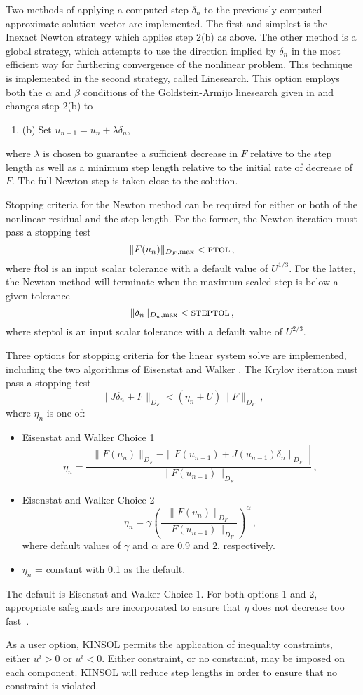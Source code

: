 Two methods of applying a computed step $\delta_n$ to the previously computed
approximate solution vector are implemented.  The 
first and simplest is the Inexact Newton strategy which applies step 2(b) 
as above.  
The other method is a global strategy,
which attempts to use the direction implied by $\delta_n$ 
in the most efficient way for furthering convergence of the nonlinear problem. 
This technique 
is implemented in the second strategy, called Linesearch.  This option
employs both the $\alpha$ and $\beta$ conditions of the Goldstein-Armijo
linesearch given in \cite{DeSc:96} and changes step 2(b) to
\begin{enumerate}
  \addtocounter{enumi}{1}
\item{(b)$\;$Set $u_{n+1} = u_n + \lambda \delta_n$},
\end{enumerate}
where $\lambda$ is chosen to guarantee a sufficient decrease in $F$ 
relative to the step length as well as a minimum step length relative 
to the initial rate of decrease of $F$.  The full Newton step is taken
close to the solution.

Stopping criteria for the Newton method can be required for either or 
both of the nonlinear residual and the step length.  For the former, 
the Newton iteration must pass a stopping test
\[ \|F(u_n)\|_{D_F,\mbox{\scriptsize max}} < \mbox{\sc ftol} \, , \]
where {\sc ftol} is an input scalar tolerance with a default value of
$U^{1/3}$. 
For the latter, the Newton method will terminate when the maximum scaled step
is below a given tolerance
\[ \|\delta_n\|_{D_u,\mbox{\scriptsize max}} < \mbox{\sc steptol} \, , \]
where {\sc steptol} is an input scalar tolerance with a default value of 
$U^{2/3}$.

Three options for stopping criteria for the linear system solve are
implemented, including the two 
algorithms of Eisenstat and Walker \cite{EiWa:96}.
The Krylov iteration must pass a stopping test
\[ \|J \delta_n + F\|_{D_F} < (\eta_n + U) \|F\|_{D_F} \, , \]
where $\eta_n$ is one of:
\begin{itemize}
\item Eisenstat and Walker Choice 1
  \[ 
  \eta_n = \frac{\left|\; \|F(u_n)\|_{D_F}  
      - \|F(u_{n-1}) + J(u_{n-1}) \delta_n \|_{D_F} 
      \; \right|}
  {\|F(u_{n-1})\|_{D_F}} \, ,  
  \]
\item Eisenstat and Walker Choice 2
  \[ 
  \eta_n = \gamma 
  \left( \frac{ \|F(u_n)\|_{D_F}}{\|F(u_{n-1})\|_{D_F}} \right)^{\alpha} \, ,
  \] 
where default values of $\gamma$ and $\alpha$ are $0.9$ and $2$,
 respectively. 
\item  $\eta_n$ = constant with 0.1 as the default.
\end{itemize}
The default is Eisenstat and Walker Choice 1. For both options 1 and 2, 
appropriate safeguards are incorporated to ensure that $\eta$ does not 
decrease too fast~\cite{EiWa:96}.

As a user option, KINSOL permits the application of inequality
constraints, either $u^i > 0$ or $u^i < 0$.  Either constraint, or
no constraint, may be imposed on each component.  KINSOL will reduce 
step lengths in order to ensure that no constraint is violated.



